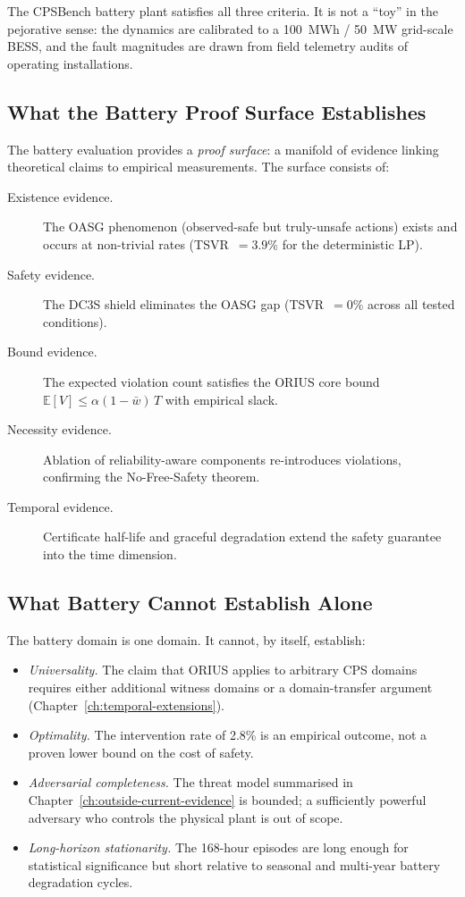The CPSBench battery plant satisfies all three criteria.  It is not a
``toy'' in the pejorative sense: the dynamics are calibrated to a
100~MWh / 50~MW grid-scale BESS, and the fault magnitudes are drawn
from field telemetry audits of operating installations.

\subsection{What the Battery Proof Surface Establishes}

The battery evaluation provides a \emph{proof surface}: a manifold of
evidence linking theoretical claims to empirical measurements.  The
surface consists of:

\begin{description}
  \item[Existence evidence.]  The OASG phenomenon (observed-safe but
    truly-unsafe actions) exists and occurs at non-trivial rates
    (TSVR~$= 3.9$\% for the deterministic LP).
  \item[Safety evidence.]  The DC3S shield eliminates the OASG gap
    (TSVR~$= 0$\% across all tested conditions).
  \item[Bound evidence.]  The expected violation count satisfies the
    ORIUS core bound $\mathbb{E}[V] \le \alpha (1 - \bar{w})\,T$
    with empirical slack.
  \item[Necessity evidence.]  Ablation of reliability-aware components
    re-introduces violations, confirming the No-Free-Safety theorem.
  \item[Temporal evidence.]  Certificate half-life and graceful
    degradation extend the safety guarantee into the time dimension.
\end{description}

\subsection{What Battery Cannot Establish Alone}

The battery domain is one domain.  It cannot, by itself, establish:
\begin{itemize}
  \item \emph{Universality.}  The claim that ORIUS applies to arbitrary
    CPS domains requires either additional witness domains or a
    domain-transfer argument (Chapter~\ref{ch:temporal-extensions}).
  \item \emph{Optimality.}  The intervention rate of 2.8\% is an
    empirical outcome, not a proven lower bound on the cost of safety.
  \item \emph{Adversarial completeness.}  The threat model
    summarised in Chapter~\ref{ch:outside-current-evidence} is bounded; a sufficiently
    powerful adversary who controls the physical plant is out of scope.
  \item \emph{Long-horizon stationarity.}  The 168-hour episodes are
    long enough for statistical significance but short relative to
    seasonal and multi-year battery degradation cycles.
\end{itemize}

